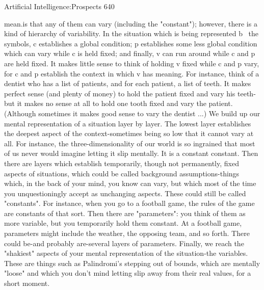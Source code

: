 Artificial Intelligence:Prospects                                                        640

mean.is that any of them can vary (including the "constant"); however, there is a kind of
hierarchy of variability. In the situation which is being represented b~ the symbols, c
establishes a global condition; p establishes some less global condition which can vary
while c is held fixed; and finally, v can run around while c and p are held fixed. It makes
little sense to think of holding v fixed while c and p vary, for c and p establish the context
in which v has meaning. For instance, think of a dentist who has a list of patients, and for
each patient, a list of teeth. It makes perfect sense (and plenty of money) to hold the
patient fixed and vary his teeth-but it makes no sense at all to hold one tooth fixed and
vary the patient. (Although sometimes it makes good sense to vary the dentist ...)
         We build up our mental representation of a situation layer by layer. The lowest
layer establishes the deepest aspect of the context-sometimes being so low that it cannot
vary at all. For instance, the three-dimensionality of our world is so ingrained that most
of us never would imagine letting it slip mentally. It is a constant constant. Then there are
layers which establish temporarily, though not permanently, fixed aspects of situations,
which could be called background assumptions-things which, in the back of your mind,
you know can vary, but which most of the time you unquestioningly accept as
unchanging aspects. These could still be called "constants". For instance, when you go to
a football game, the rules of the game are constants of that sort. Then there are
"parameters": you think of them as more variable, but you temporarily hold them
constant. At a football game, parameters might include the weather, the opposing team,
and so forth. There could be-and probably are-several layers of parameters. Finally, we
reach the "shakiest" aspects of your mental representation of the situation-the variables.
These are things such as Palindromi's stepping out of bounds, which are mentally "loose"
and which you don't mind letting slip away from their real values, for a short moment.

